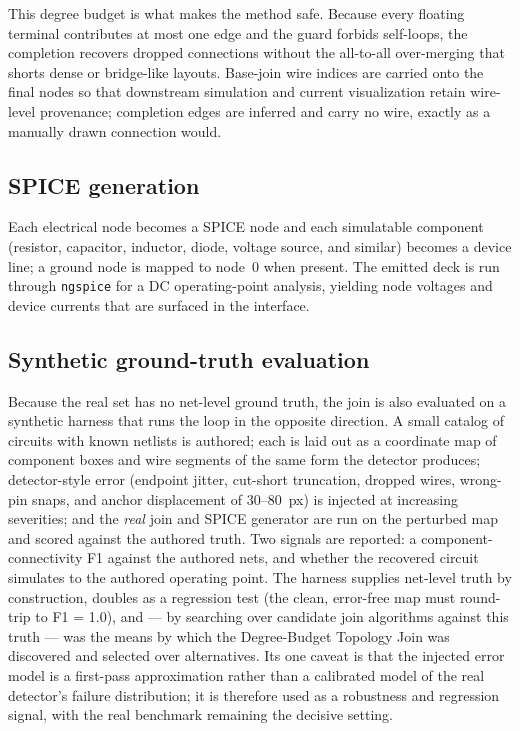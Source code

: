 This degree budget is what makes the method safe. Because every floating terminal
contributes at most one edge and the guard forbids self-loops, the completion
recovers dropped connections without the all-to-all over-merging that shorts dense
or bridge-like layouts. Base-join wire indices are carried onto the final nodes so
that downstream simulation and current visualization retain wire-level provenance;
completion edges are inferred and carry no wire, exactly as a manually drawn
connection would.

\subsection*{SPICE generation}

Each electrical node becomes a SPICE \cite{Nagel1973} node and each simulatable component
(resistor, capacitor, inductor, diode, voltage source, and similar) becomes a
device line; a ground node is mapped to node~0 when present. The emitted deck is
run through \texttt{ngspice} for a DC operating-point analysis, yielding node
voltages and device currents that are surfaced in the interface.

\subsection*{Synthetic ground-truth evaluation}

Because the real set has no net-level ground truth, the join is also evaluated on
a synthetic harness that runs the loop in the opposite direction. A small catalog
of circuits with known netlists is authored; each is laid out as a coordinate map
of component boxes and wire segments of the same form the detector produces;
detector-style error (endpoint jitter, cut-short truncation, dropped wires,
wrong-pin snaps, and anchor displacement of 30--80~px) is injected at increasing
severities; and the \emph{real} join and SPICE generator are run on the perturbed
map and scored against the authored truth. Two signals are reported: a
component-connectivity F1 against the authored nets, and whether the recovered
circuit simulates to the authored operating point. The harness supplies net-level
truth by construction, doubles as a regression test (the clean, error-free map
must round-trip to F1 = 1.0), and --- by searching over candidate join algorithms
against this truth --- was the means by which the Degree-Budget Topology Join was
discovered and selected over alternatives. Its one caveat is that the injected
error model is a first-pass approximation rather than a calibrated model of the
real detector's failure distribution; it is therefore used as a robustness and
regression signal, with the real benchmark remaining the decisive setting.

